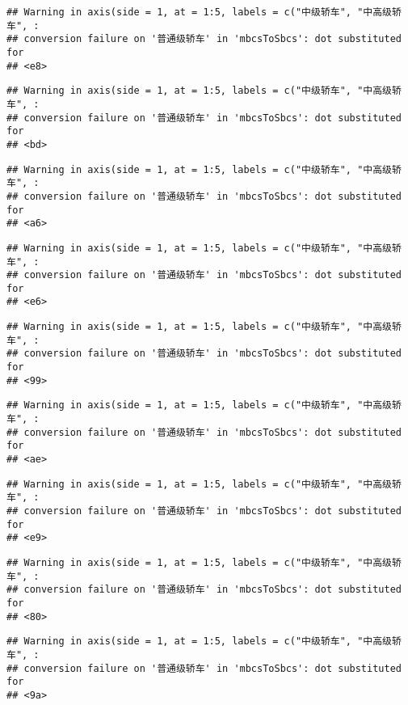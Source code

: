 \documentclass[]{article}
\begin{document}
\begin{verbatim}
## Warning in axis(side = 1, at = 1:5, labels = c("中级轿车", "中高级轿车", :
## conversion failure on '普通级轿车' in 'mbcsToSbcs': dot substituted for
## <e8>
\end{verbatim}

\begin{verbatim}
## Warning in axis(side = 1, at = 1:5, labels = c("中级轿车", "中高级轿车", :
## conversion failure on '普通级轿车' in 'mbcsToSbcs': dot substituted for
## <bd>
\end{verbatim}

\begin{verbatim}
## Warning in axis(side = 1, at = 1:5, labels = c("中级轿车", "中高级轿车", :
## conversion failure on '普通级轿车' in 'mbcsToSbcs': dot substituted for
## <a6>
\end{verbatim}

\begin{verbatim}
## Warning in axis(side = 1, at = 1:5, labels = c("中级轿车", "中高级轿车", :
## conversion failure on '普通级轿车' in 'mbcsToSbcs': dot substituted for
## <e6>
\end{verbatim}

\begin{verbatim}
## Warning in axis(side = 1, at = 1:5, labels = c("中级轿车", "中高级轿车", :
## conversion failure on '普通级轿车' in 'mbcsToSbcs': dot substituted for
## <99>
\end{verbatim}

\begin{verbatim}
## Warning in axis(side = 1, at = 1:5, labels = c("中级轿车", "中高级轿车", :
## conversion failure on '普通级轿车' in 'mbcsToSbcs': dot substituted for
## <ae>
\end{verbatim}

\begin{verbatim}
## Warning in axis(side = 1, at = 1:5, labels = c("中级轿车", "中高级轿车", :
## conversion failure on '普通级轿车' in 'mbcsToSbcs': dot substituted for
## <e9>
\end{verbatim}

\begin{verbatim}
## Warning in axis(side = 1, at = 1:5, labels = c("中级轿车", "中高级轿车", :
## conversion failure on '普通级轿车' in 'mbcsToSbcs': dot substituted for
## <80>
\end{verbatim}

\begin{verbatim}
## Warning in axis(side = 1, at = 1:5, labels = c("中级轿车", "中高级轿车", :
## conversion failure on '普通级轿车' in 'mbcsToSbcs': dot substituted for
## <9a>
\end{verbatim}
\end{document}

